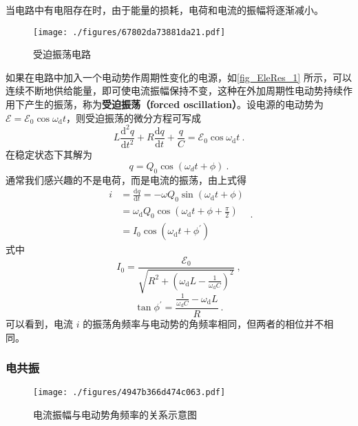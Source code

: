 

当电路中有电阻存在时，由于能量的损耗，电荷和电流的振幅将逐渐减小。
\begin{figure}[ht]
\centering
\texttt{[image: ./figures/67802da73881da21.pdf]}
\caption{受迫振荡电路} \label{fig_EleRes_1}
\end{figure}
如果在电路中加入一个电动势作周期性变化的电源，如\autoref{fig_EleRes_1} 所示，可以连续不断地供给能量，即可使电流振幅保持不变，这种在外加周期性电动势持续作用下产生的振荡，称为\textbf{受迫振荡（forced oscillation）}。设电源的电动势为 $\mathscr{E}=\mathscr{E}_{0} \cos \omega_{\mathrm{d}} t$，则受迫振荡的微分方程可写成
\begin{equation}
L \frac{\mathrm{d}^{2} q}{\mathrm{d} t^{2}}+R \frac{\mathrm{d} q}{\mathrm{d} t}+\frac{q}{C}=\mathscr{E}_{0} \cos \omega_{\mathrm{d}} t~.
\end{equation}
在稳定状态下其解为
\begin{equation}
q=Q_{0} \cos \left(\omega_{d} t+\phi\right)~.
\end{equation}
通常我们感兴趣的不是电荷，而是电流的振荡，由上式得
\begin{equation}
\begin{aligned}i&=\frac{\mathrm{d} q}{\mathrm{d} t}=-\omega Q_{0} \sin \left(\omega_{\mathrm{d}} t+\phi\right) \\ &=\omega_{\mathrm{d}} Q_{0} \cos \left(\omega_{\mathrm{d}} t+\phi+\frac{\pi}{2}\right) \\ &=I_{0} \cos \left(\omega_{\mathrm{d}} t+\phi^{\prime}\right)\end{aligned}
~.\end{equation}
式中
\begin{equation} \label{eq_EleRes_1}
I_{0}=\frac{\mathscr{E}_{0}}{\sqrt{R^{2}+\left(\omega_{\mathrm{d}} L-\frac{1}{\omega_{\mathrm{d}} C}\right)^{2}}}~,
\end{equation}
\begin{equation} \label{eq_EleRes_2}
\tan \phi^{\prime}=\frac{\frac{1}{\omega_{\mathrm{d}} C}-\omega_{\mathrm{d}} L}{R}~.
\end{equation}
可以看到，电流 $i$ 的振荡角频率与电动势的角频率相同，但两者的相位并不相同。

\subsubsection{电共振}
\begin{figure}[ht]
\centering
\texttt{[image: ./figures/4947b366d474c063.pdf]}
\caption{电流振幅与电动势角频率的关系示意图} \label{fig_EleRes_2}
\end{figure}

